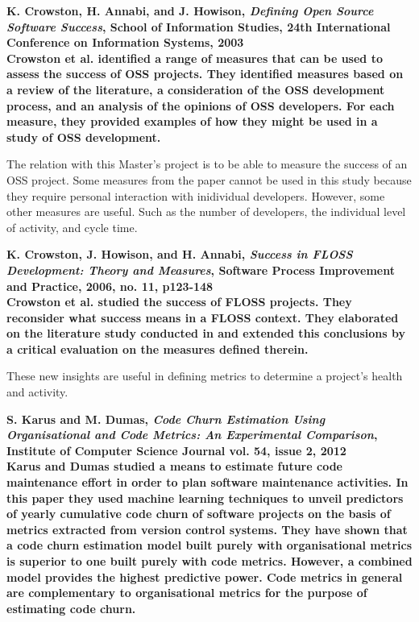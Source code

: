 \begin{thebibliography}{99}
	 \bfseries{K. Crowston, H. Annabi, and J. Howison,
		\emph{Defining Open Source Software Success}, School of Information Studies,
		24th International Conference on Information Systems, 2003}\rm
		\\
		
		Crowston et al. identified a range of measures that can be used to assess the
		success of OSS projects. They identified measures based on a review of the
		literature, a consideration of the OSS development process, and an analysis of
		the opinions of OSS developers. For each measure, they provided examples of
		how they might be used in a study of OSS development.

		The relation with this Master's project is to be able to measure the success
		of an OSS project. Some measures from the paper cannot be used in this study
		because they require personal interaction with inidividual developers.
		However, some other measures are useful. Such as the number of developers, the
		individual level of activity, and cycle time.
		
	 \bfseries{K. Crowston, J. Howison, and H. Annabi,
		\emph{Success in FLOSS Development: Theory and Measures}, Software Process
		Improvement and Practice, 2006, no. 11, p123-148}\rm
		\\
		
		Crowston et al. studied the success of FLOSS projects. They reconsider what
		success means in a FLOSS context. They elaborated on the literature study
		conducted in \cite{crowston2003} and extended this conclusions by a critical
		evaluation on the measures defined therein.
		
		These new insights are useful in defining metrics to determine a project's
		health and activity.

	 \bfseries{S. Karus and M. Dumas, \emph{Code Churn Estimation
		Using Organisational and Code Metrics: An Experimental Comparison}, Institute
		of Computer Science Journal vol. 54, issue 2, 2012}\rm
		\\
	
		Karus and Dumas studied a means to estimate future code maintenance effort in
		order to plan software maintenance activities. In this paper they used machine
		learning techniques to unveil predictors of yearly cumulative code churn of
		software projects on the basis of metrics extracted from version control
		systems. They have shown that a code churn estimation model built purely with
		organisational metrics is superior to one built purely with code metrics.
		However, a combined model provides the highest predictive power. Code metrics
		in general are complementary to organisational metrics for the purpose of
		estimating code churn.


\end{thebibliography}
